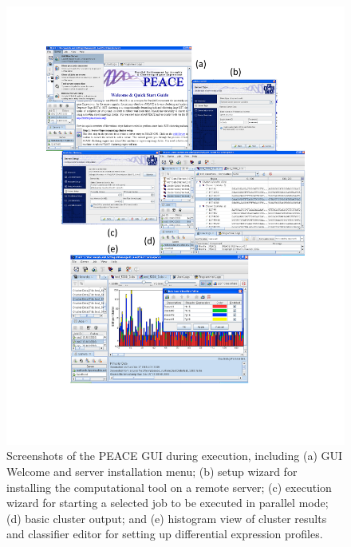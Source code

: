 \documentclass[a4,center,fleqn]{NAR}
\begin{document}
\begin{figure}[b]
\centerline{
\includegraphics[trim=0cm 3cm 0cm 1cm, clip, scale=0.9]{screen.d/screen.pdf} 
}
\label{screen}
\caption{Screenshots of the PEACE GUI during execution, including (a)
GUI Welcome and server installation menu; (b) setup wizard for
installing the computational tool on a remote server; (c) execution
wizard for starting a selected job to be executed in parallel mode;
(d) basic cluster output; and (e) histogram view of cluster results
and classifier editor for setting up differential expression profiles.}
\end{figure}
\end{document}
